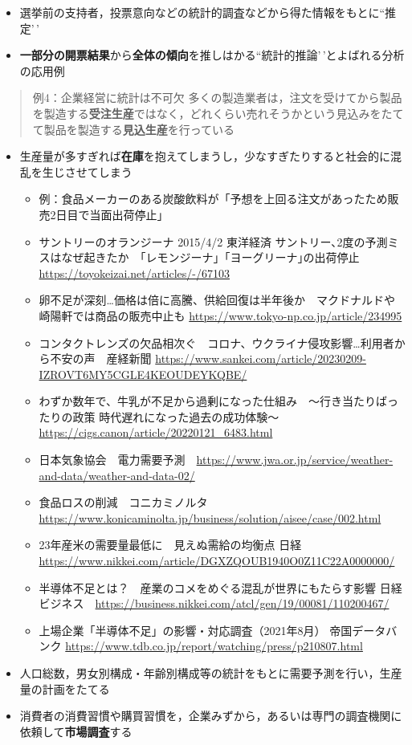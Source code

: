 \documentclass[
]{book}
\providecommand{\tightlist}{%
  \setlength{\itemsep}{0pt}\setlength{\parskip}{0pt}}
\theoremstyle{definition}
\theoremstyle{definition}
\theoremstyle{definition}
\theoremstyle{definition}
\theoremstyle{remark}
\begin{document}
\begin{itemize}
\tightlist
\item
  選挙前の支持者，投票意向などの統計的調査などから得た情報をもとに``推定'\,'
\item
  \textbf{一部分の開票結果}から\textbf{全体の傾向}を推しはかる``統計的推論'\,'とよばれる分析の応用例
\end{itemize}

\begin{quote}
例4：企業経営に統計は不可欠
多くの製造業者は，注文を受けてから製品を製造する\textbf{受注生産}ではなく，どれくらい売れそうかという見込みをたてて製品を製造する\textbf{見込生産}を行っている
\end{quote}

\begin{itemize}
\tightlist
\item
  生産量が多すぎれば\textbf{在庫}を抱えてしまうし，少なすぎたりすると社会的に混乱を生じさせてしまう

  \begin{itemize}
  \item
    例：食品メーカーのある炭酸飲料が「予想を上回る注文があったため販売2日目で当面出荷停止」
  \item
    サントリーのオランジーナ 2015/4/2
    東洋経済 サントリー､2度の予測ミスはなぜ起きたか　｢レモンジーナ｣「ヨーグリーナ｣の出荷停止
    \url{https://toyokeizai.net/articles/-/67103}
  \item
    卵不足が深刻\ldots 価格は倍に高騰、供給回復は半年後か　マクドナルドや崎陽軒では商品の販売中止も
    \url{https://www.tokyo-np.co.jp/article/234995}
  \item
    コンタクトレンズの欠品相次ぐ　コロナ、ウクライナ侵攻影響\ldots 利用者から不安の声　産経新聞
    \url{https://www.sankei.com/article/20230209-IZROVT6MY5CGLE4KEOUDEYKQBE/}
  \item
    わずか数年で、牛乳が不足から過剰になった仕組み　〜行き当たりばったりの政策 時代遅れになった過去の成功体験～
    \url{https://cigs.canon/article/20220121_6483.html}
  \item
    日本気象協会　電力需要予測　\url{https://www.jwa.or.jp/service/weather-and-data/weather-and-data-02/}
  \item
    食品ロスの削減　コニカミノルタ　\url{https://www.konicaminolta.jp/business/solution/aisee/case/002.html}
  \item
    23年産米の需要量最低に　見えぬ需給の均衡点
    日経　\url{https://www.nikkei.com/article/DGXZQOUB1940O0Z11C22A0000000/}
  \item
    半導体不足とは？　産業のコメをめぐる混乱が世界にもたらす影響 日経ビジネス　\url{https://business.nikkei.com/atcl/gen/19/00081/110200467/}
  \item
    上場企業「半導体不足」の影響・対応調査（2021年8月） 帝国データバンク \url{https://www.tdb.co.jp/report/watching/press/p210807.html}
  \end{itemize}
\item
  人口総数，男女別構成・年齢別構成等の統計をもとに需要予測を行い，生産量の計画をたてる
\item
  消費者の消費習慣や購買習慣を，企業みずから，あるいは専門の調査機関に依頼して\textbf{市場調査}する
\end{itemize}
\end{document}
